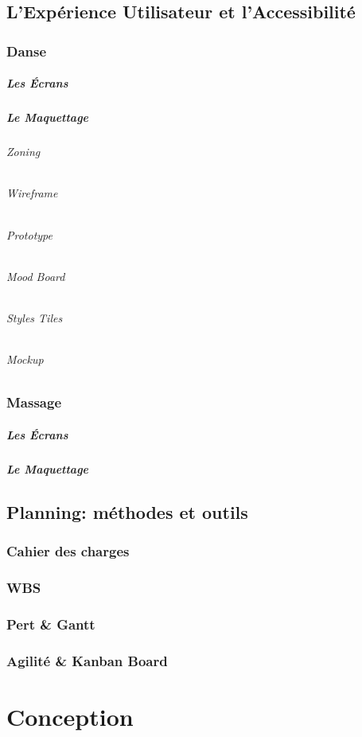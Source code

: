 \documentclass[11pt,a4paper]{report}
\begin{document}
	\section{L'Expérience Utilisateur et l'Accessibilité}
		\subsection{Danse}
			\paragraph{Les Écrans}
			\paragraph{Le Maquettage}
				\subparagraph{Zoning}
				\subparagraph{Wireframe}
				\subparagraph{Prototype}
				\subparagraph{Mood Board}
				\subparagraph{Styles Tiles}
				\subparagraph{Mockup}
		\subsection{Massage}
			\paragraph{Les Écrans}
			\paragraph{Le Maquettage}
	\section{Planning: méthodes et outils}
		\subsection{Cahier des charges}
		\subsection{WBS}
		\subsection{Pert \& Gantt}
		\subsection{Agilité \& Kanban Board}

\chapter{Conception}
\end{document}
